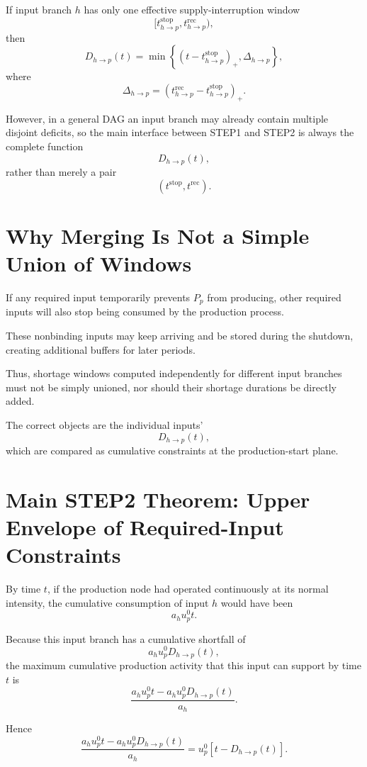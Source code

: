 \documentclass[11pt]{article}
\begin{document}
If input branch \(h\) has only one effective supply-interruption window
\[
[t_{h\to p}^{\mathrm{stop}},
t_{h\to p}^{\mathrm{rec}}),
\]
then
\[
\boxed{
D_{h\to p}(t)
=
\min\left\{
(t-t_{h\to p}^{\mathrm{stop}})_+,
\Delta_{h\to p}
\right\},
}
\tag{7}
\]
where
\[
\boxed{
\Delta_{h\to p}
=
\left(
t_{h\to p}^{\mathrm{rec}}
-
t_{h\to p}^{\mathrm{stop}}
\right)_+.
}
\tag{8}
\]

However, in a general DAG an input branch may already contain multiple disjoint deficits,
so the main interface between STEP1 and STEP2 is always the complete function
\[
\boxed{D_{h\to p}(t),}
\]
rather than merely a pair
\[
(t^{\mathrm{stop}},t^{\mathrm{rec}}).
\]

\section{Why Merging Is Not a Simple Union of Windows}

If any required input temporarily prevents \(P_p\) from producing,
other required inputs will also stop being consumed by the production process.

These nonbinding inputs may keep arriving and be stored during the shutdown,
creating additional buffers for later periods.

Thus, shortage windows computed independently for different input branches must not be
simply unioned, nor should their shortage durations be directly added.

The correct objects are the individual inputs'
\[
D_{h\to p}(t),
\]
which are compared as cumulative constraints at the production-start plane.

\section{Main STEP2 Theorem: Upper Envelope of Required-Input Constraints}

By time \(t\), if the production node had operated continuously at its normal intensity,
the cumulative consumption of input \(h\) would have been
\[
a_hu_p^0t.
\]

Because this input branch has a cumulative shortfall of
\[
a_hu_p^0D_{h\to p}(t),
\]
the maximum cumulative production activity that this input can support by time \(t\) is
\[
\frac{
a_hu_p^0t
-
a_hu_p^0D_{h\to p}(t)
}{a_h}.
\]

Hence
\[
\boxed{
\frac{
a_hu_p^0t
-
a_hu_p^0D_{h\to p}(t)
}{a_h}
=
u_p^0
\left[
t-D_{h\to p}(t)
\right].
}
\tag{9}
\]
\end{document}
